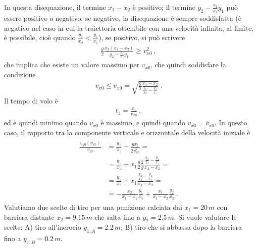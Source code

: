 \documentclass[letterpaper,10pt,italian]{jupyterBook}
\begin{document}
\sphinxAtStartPar
In questa disequazione, il termine \(x_1 - x_2\) è positivo; il termine \(y_2 - \frac{x_2}{x_1} y_1\) può essere positivo o negativo: se negativo, la disequazione è sempre soddisfatta (è negativo nel caso in cui la traiettoria ottenibile con una velocità infinita, al limite, è possibile, cioè quando \(\frac{y_2}{x_2} < \frac{y_1}{x_1}\)), se positivo, si può scrivere
\begin{equation*}
\begin{split}\frac{g}{2}  \frac{x_2(x_1 - x_2)}{y_2 - \frac{x_2}{x_1} y_1} \ge v^2_{x0} \ ,\end{split}
\end{equation*}
\sphinxAtStartPar
che implica che esiste un valore massimo per \(v_{x0}\), che quindi soddisfare la condizione
\begin{equation*}
\begin{split}v_{x0} \le \overline{v}_{x0} = \sqrt{\frac{g}{2} \frac{x_1 - x_2}{ \frac{y_2}{x_2} - \frac{y_1}{x_1}}} \ .\end{split}
\end{equation*}
\sphinxAtStartPar
Il tempo di volo è
\begin{equation*}
\begin{split}t_1 = \frac{x_1}{v_{x0}} \ ,\end{split}
\end{equation*}
\sphinxAtStartPar
ed è quindi minimo quando \(v_{x0}\) è massimo, e quindi quando \(v_{x0} = \overline{v}_{x0}\). In questo caso, il rapporto tra la componente verticale e orizzontale della velocità iniziale è
\begin{equation*}
\begin{split}\begin{aligned}
  \frac{v_{y0}(\overline{v}_{x0})}{\overline{v}_{x0}}
  & = \frac{y_1}{x_1} + \frac{g x_1}{2 \overline{v}^2_{x0}} = \\
  & = \frac{y_1}{x_1} +  x_1 \frac{g}{2} \frac{2}{g} \frac{\frac{y_2}{x_2} - \frac{y_1}{x_1}}{x_1 - x_2} = \\
  & = \frac{y_1}{x_1} +  x_1 \frac{\frac{y_2}{x_2} - \frac{y_1}{x_1}}{x_1 - x_2} = \\
  & = -\frac{x_2}{x_1 - x_2} \frac{y_1}{x_1} +  \frac{x_1}{x_1-x_2} \frac{y_2}{x_2}  \ .
\end{aligned}\end{split}
\end{equation*}
\sphinxAtStartPar
{} Valutiamo due scelte di tiro per una punizione calciata dai \(x_1 = 20 \, m\) con barriera distante \(x_2 = 9.15 \, m\) che salta fino a \(y_2 = 2.5 \, m\). Si vuole valutare le scelte: A) tiro all’incrocio \(y_{1,A} = 2.2 \, m\); B) tiro che si abbassa dopo la barriera fino a \(y_{1,B} = 0.2 \, m\).
\end{document}
